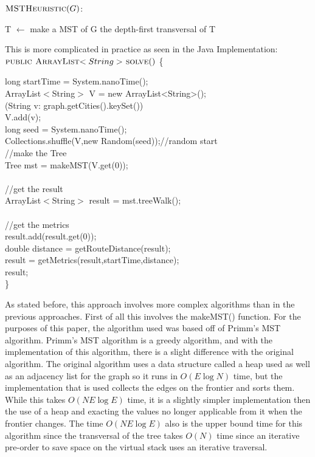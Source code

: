 \documentclass[midd]{thesis}
\newcommand{\tab}{\hspace*{2em}}
\begin{document}
$\textnormal{\scshape MSTHeuristic}(G)$:
\begin{codebox}
\li T $\gets$ make a MST of G
\li \Return the depth-first transversal of T
\end{codebox}
This is more complicated in practice as seen in the Java Implementation:\\
$\textnormal{\scshape public ArrayList$<String>$ solve}()$ \{
\begin{codebox}
\tab long startTime = System.nanoTime();\\
\tab ArrayList$<$String$>$ V = new ArrayList<String>();\\
\tab \For(String v: graph.getCities().keySet())\\
\tab\tab V.add(v);\End\\
\tab long seed = System.nanoTime();\\
\tab Collections.shuffle(V,new Random(seed));//random start\\
\tab//make the Tree\\
\tab Tree mst = makeMST(V.get(0));\\\\
\tab//get the result\\
\tab ArrayList$<$String$>$ result = mst.treeWalk();\\\\	
\tab//get the metrics\\
\tab result.add(result.get(0));\\
\tab double distance = getRouteDistance(result);\\
\tab result = getMetrics(result,startTime,distance);\\
\Return result;\\
\}
\end{codebox}
\tab As stated before, this approach involves more complex algorithms than in the previous approaches. First of all this involves the makeMST() function. For the purposes of this paper, the algorithm used was based off of Primm's MST algorithm. Primm's MST algorithm is a greedy algorithm, and with the implementation of this algorithm, there is a slight difference with the original algorithm. The original algorithm uses a data structure called a heap used as well as an adjacency list for the graph so it runs in $O(E\log N)$ time, but the implementation that is used collects the edges on the frontier and sorts them. While this takes $O(NE\log E)$ time, it is a slightly simpler implementation then the use of a heap and exacting the values no longer applicable from it when the frontier changes. The time $O(NE\log E)$ also is the upper bound time for this algorithm since the transversal of the tree takes $O(N)$ time since an iterative pre-order to save space on the virtual stack uses an iterative traversal.\\
\end{document}
